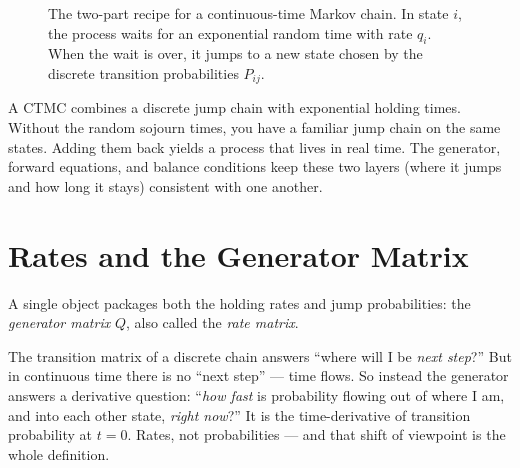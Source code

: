 \begin{figure}[htbp]
\centering
{}
\caption{The two-part recipe for a continuous-time Markov chain. In state $i$, the process waits for an exponential random time with rate $q_i$. When the wait is over, it jumps to a new state chosen by the discrete transition probabilities $P_{ij}$.}
\label{ch27:fig-recipe}
\end{figure}

\begin{happeningbox}
A CTMC combines a discrete jump chain with exponential holding times. Without the random sojourn times,
you have a familiar jump chain on the same states. Adding them back yields a process that
lives in real time. The generator, forward equations, and balance conditions keep these two
layers (where it jumps and how long it stays) consistent with one another.
\end{happeningbox}

\section{Rates and the Generator Matrix}
\label{ch27:generator}

A single object packages both the holding rates and jump probabilities:
the \emph{generator matrix} $Q$, also called the \emph{rate matrix}.

\begin{intuitionbox}
The transition matrix of a discrete chain answers ``where will I be \emph{next step}?'' But in
continuous time there is no ``next step'' --- time flows. So instead the generator answers a
derivative question: ``\emph{how fast} is probability flowing out of where I am, and into each other
state, \emph{right now}?'' It is the time-derivative of transition probability at $t = 0$. Rates,
not probabilities --- and that shift of viewpoint is the whole definition.
\end{intuitionbox}

